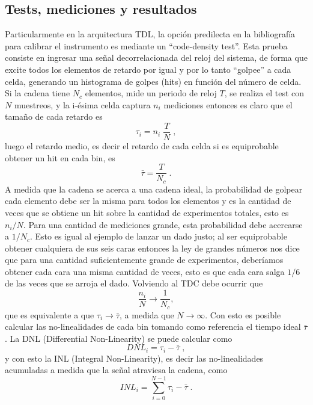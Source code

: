\subsection{Tests, mediciones y resultados}
Particularmente en la arquitectura TDL, la opción predilecta en la bibliografía para calibrar el instrumento es mediante 
un ``code-density test''. Esta prueba consiste en ingresar una señal decorrelacionada del reloj del sistema, de forma que 
excite todos los elementos de retardo por igual y por lo tanto ``golpee'' a cada celda, generando un
histograma de golpes (hits) en función del número de celda. Si la cadena tiene
$N_c$ elementos, mide un periodo de reloj $T$, se realiza el test con $N$ muestreos,
y la i-ésima celda captura $n_i$ mediciones entonces es claro que el 
tamaño de cada retardo es
\begin{equation}
     \tau_i = n_i \; \dfrac{T}{N} \; ,
     \label{eq: tau_i}
\end{equation}
luego el retardo medio, es decir el retardo de cada celda si es equiprobable obtener un hit 
en cada bin, es
\begin{equation}
     \bar{\tau} = \dfrac{T}{N_c} \; .
     \label{eq: tau_medio}
\end{equation}
A medida que la cadena se acerca a una cadena ideal, la probabilidad de golpear cada
elemento debe ser la misma para todos los elementos y es la cantidad de veces que se obtiene un hit
sobre la cantidad de experimentos totales, esto es $n_i/N$. Para una cantidad de mediciones grande,
esta probabilidad debe acercarse a $1/N_c$. Esto es igual al ejemplo de lanzar un dado justo; al ser
equiprobable obtener cualquiera de sus seis caras entonces la ley de grandes números nos dice
que para una cantidad suficientemente grande de experimentos, deberíamos obtener cada cara una misma cantidad
de veces, esto es que cada cara salga $1/6$ de las veces que se arroja el dado.
Volviendo al TDC debe ocurrir que 
\begin{equation*}
     \dfrac{n_i}{N} \longrightarrow \dfrac{1}{N_c},
\end{equation*}
que es equivalente a que $\tau_i \longrightarrow \bar{\tau}$, a medida que $N \rightarrow \infty$.
Con esto es posible calcular las no-linealidades de cada bin tomando como referencia
el tiempo ideal $\bar{\tau}$. La DNL (Differential Non-Linearity) 
se puede calcular como
\begin{equation}
     DNL_i = \tau_i - \bar{\tau} \; ,
     \label{eq: DNL}
\end{equation}
y con esto la INL (Integral Non-Linearity), es decir las no-linealidades acumuladas a medida que la 
señal atraviesa la cadena, como
\begin{equation}
     INL_i = \sum_{i=0}^{N-1} {\tau_i - \bar{\tau}} \; .
     \label{eq: INL}
\end{equation}

